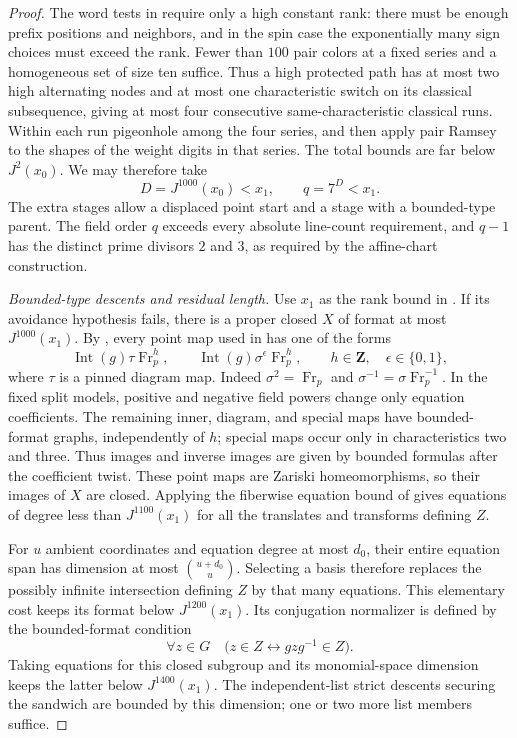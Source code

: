 \begin{proof}
The word tests in  require
only a high constant rank: there must be enough
prefix positions and neighbors, and in the spin case the exponentially
many sign choices must exceed the rank.  Fewer than $100$ pair colors
at a fixed series and a homogeneous set of size ten suffice.  Thus a
high protected path has at most two high alternating nodes and at most
one characteristic switch on its classical subsequence, giving at most
four consecutive same-characteristic classical runs.  Within each run
pigeonhole among the four series, and then apply pair Ramsey to the
shapes of the weight digits in that series.  The total bounds are far
below $J^2(x_0)$.  We may therefore take
\begin{equation}\label{q:Dq}
                  D=J^{1000}(x_0)<x_1,
                  \qquad q=7^D<x_1.
\end{equation}
The extra stages allow a displaced point start and a stage with a
bounded-type parent.  The field order $q$ exceeds every absolute
line-count requirement, and $q-1$ has the distinct prime divisors $2$
and $3$, as required by the affine-chart construction.

\emph{Bounded-type descents and residual length.}
Use $x_1$ as the rank bound in .  If its avoidance
hypothesis fails, there is a proper closed $X$ of format at most
$J^{1000}(x_1)$.  By , every point map used in
 has one of the forms
\[
 \operatorname{Int}(g)\tau\operatorname{Fr}_p^h,
 \qquad
 \operatorname{Int}(g)\sigma^\epsilon\operatorname{Fr}_p^h,
 \qquad h\in\mathbf Z,\quad\epsilon\in\{0,1\},
\]
where $\tau$ is a pinned diagram map.  Indeed
$\sigma^2=\operatorname{Fr}_p$ and
$\sigma^{-1}=\sigma\operatorname{Fr}_p^{-1}$.  In the fixed split
models, positive and negative field powers change only equation
coefficients.  The remaining inner, diagram, and special maps have
bounded-format graphs, independently of $h$; special maps occur only
in characteristics two and three.  Thus images and inverse images
are given by bounded formulas after the coefficient twist.  These
point maps are Zariski homeomorphisms, so their images of $X$ are
closed.  Applying the fiberwise equation bound of
 gives equations of degree less than
$J^{1100}(x_1)$ for all the translates and transforms defining $Z$.

For $u$ ambient coordinates and equation degree at most $d_0$, their
entire equation span has dimension at most $\binom{u+d_0}{u}$.
Selecting a basis therefore replaces the possibly infinite
intersection defining $Z$ by that many equations.  This elementary
cost keeps its format below $J^{1200}(x_1)$.  Its conjugation
normalizer is defined by the bounded-format condition
\[
 \forall z\in G\quad
       \bigl(z\in Z\longleftrightarrow gzg^{-1}\in Z\bigr).
\]
Taking equations for this closed subgroup and its monomial-space
dimension keeps the latter below $J^{1400}(x_1)$.  The independent-list
strict descents securing the sandwich are bounded by this dimension;
one or two more list members suffice.


\end{proof}
